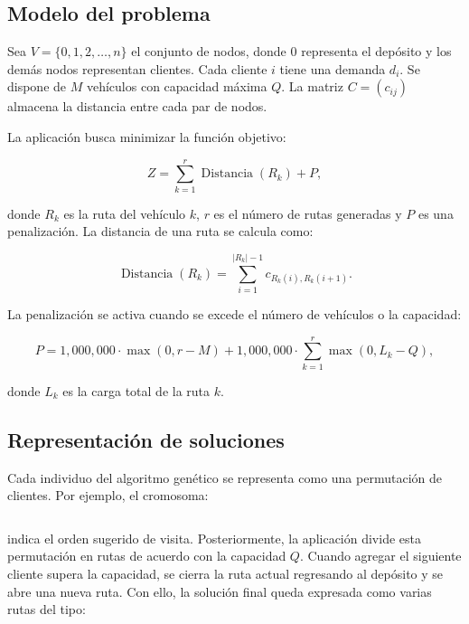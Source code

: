 \documentclass[runningheads]{llncs}
\begin{document}
\subsection{Modelo del problema}

Sea $V=\{0,1,2,\ldots,n\}$ el conjunto de nodos, donde $0$ representa el depósito y los demás nodos representan clientes. Cada cliente $i$ tiene una demanda $d_i$. Se dispone de $M$ vehículos con capacidad máxima $Q$. La matriz $C=(c_{ij})$ almacena la distancia entre cada par de nodos.

La aplicación busca minimizar la función objetivo:

\begin{equation}
Z = \sum_{k=1}^{r} \operatorname{Distancia}(R_k) + P,
\end{equation}

donde $R_k$ es la ruta del vehículo $k$, $r$ es el número de rutas generadas y $P$ es una penalización. La distancia de una ruta se calcula como:

\begin{equation}
\operatorname{Distancia}(R_k)=\sum_{i=1}^{|R_k|-1} c_{R_k(i),R_k(i+1)}.
\end{equation}

La penalización se activa cuando se excede el número de vehículos o la capacidad:

\begin{equation}
P = 1{,}000{,}000 \cdot \max(0,r-M) + 1{,}000{,}000 \cdot \sum_{k=1}^{r} \max(0,L_k-Q),
\end{equation}

donde $L_k$ es la carga total de la ruta $k$.

\subsection{Representación de soluciones}

Cada individuo del algoritmo genético se representa como una permutación de clientes. Por ejemplo, el cromosoma:

\begin{equation}
[3,1,4,2,5]
\end{equation}

indica el orden sugerido de visita. Posteriormente, la aplicación divide esta permutación en rutas de acuerdo con la capacidad $Q$. Cuando agregar el siguiente cliente supera la capacidad, se cierra la ruta actual regresando al depósito y se abre una nueva ruta. Con ello, la solución final queda expresada como varias rutas del tipo:
\end{document}
